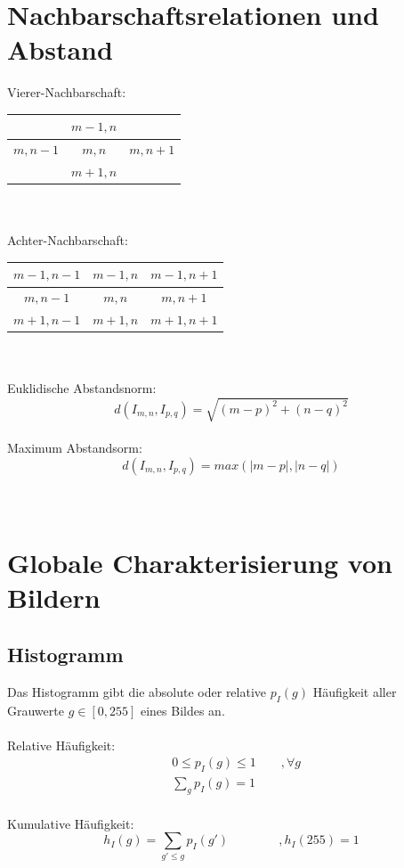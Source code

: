 \section{Nachbarschaftsrelationen und Abstand}
Vierer-Nachbarschaft:
\begin{center}
	\begin{tabular}{|c|c|c|}
	\hline  & $m-1,n$ &  \\ 
	\hline $m,n-1$ & $m,n$ & $m,n+1$ \\ 
	\hline  & $m+1,n$ &  \\ 
	\hline 
	\end{tabular} 
\end{center}
~\\\\
Achter-Nachbarschaft:
\begin{center}
	\begin{tabular}{|c|c|c|}
	\hline  $m-1,n-1$	& $m-1,n$ 	& $m-1,n+1$  \\ 
	\hline 	$m,n-1$ 	& $m,n$ 	& $m,n+1$ \\ 
	\hline  $m+1,n-1$	& $m+1,n$ 	& $m+1,n+1$ \\ 
	\hline 
	\end{tabular} 
\end{center}
~\\\\
Euklidische Abstandsnorm:
\[
	d(I_{m,n},I_{p,q}) = \sqrt{(m-p)^2+(n-q)^2}
\]
\\
Maximum Abstandsorm:
\[
	d(I_{m,n},I_{p,q}) = max \left( \left| m-p \right|, \left| n-q \right| \right)
\]
\\\\

\section{Globale Charakterisierung von Bildern}
\subsection{Histogramm}
Das Histogramm gibt die absolute oder relative $p_I(g)$ Häufigkeit aller Grauwerte $g \in [0,255]$ eines Bildes an.\\\\
Relative Häufigkeit:
\[\begin{aligned}
	&0 \leq p_I(g) \leq 1 \qquad , \forall g\\
	&\sum_{g} p_I(g) = 1
\end{aligned}\]\\
Kumulative Häufigkeit:
\[
	h_I(g) = \sum_{g'\leq g} p_I(g') \qquad \qquad , h_I(255) = 1
\]


